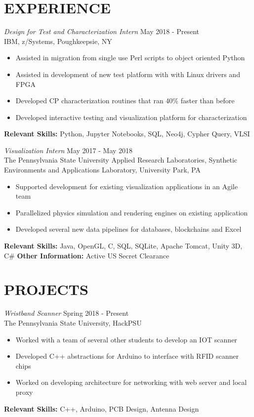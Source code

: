 \documentclass[line,margin]{res}
\begin{document}
\begin{resume}
		\section{EXPERIENCE}{\sl Design for Test and Characterization Intern} \hfill May 2018 - Present\\
		IBM, z/Systems, Poughkeepsie, NY
		\begin{itemize}  \itemsep -2pt
			\item Assisted in migration from single use Perl scripts to object oriented Python
			\item Assisted in development of new test platform with with Linux drivers and FPGA
			\item Developed CP characterization routines that ran 40\% faster than before
			\item Developed interactive testing and visualization platform for characterization
			\vspace*{-\baselineskip}		
		\end{itemize}
		\textbf{Relevant Skills:} Python, Jupyter Notebooks, SQL, Neo4j, Cypher Query, VLSI
		
		{\sl Visualization Intern} \hfill May 2017 - May 2018 \\
		The Pennsylvania State University Applied Research Laboratories, Synthetic Environments and Applications Laboratory, University Park, PA
		\begin{itemize}  \itemsep -2pt
			\item Supported development for existing visualization applications in an Agile team
			\item Parallelized physics simulation and rendering engines on existing application
			\item Developed several new data pipelines for databases, blockchains and Excel
			\vspace*{-\baselineskip}		
		\end{itemize}
		\textbf{Relevant Skills:} Java, OpenGL, C, SQL, SQLite, Apache Tomcat, Unity 3D, C\#
		\textbf{Other Information:} Active US Secret Clearance
		
		\section{PROJECTS}
		{\sl Wristband Scanner} \hfill Spring 2018 - Present\\
		The Pennsylvania State University, HackPSU
		\begin{itemize}  \itemsep -2pt
			\item Worked with a team of several other students to develop an IOT scanner
			\item Developed C++ abstractions for Arduino to interface with RFID scanner chips
			\item Worked on developing architecture for networking with web server and local proxy
		\end{itemize}
		\vspace*{-\baselineskip}		
		\textbf{Relevant Skills:} C++, Arduino, PCB Design, Antenna Design
		

\end{resume}
\end{document}
